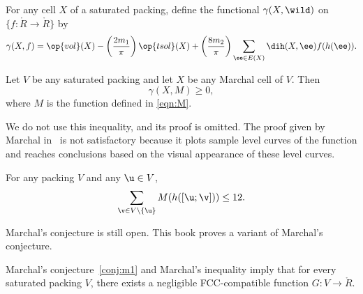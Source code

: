 \begin{definition}[$\gamma$] 
   For any cell $X$ of a saturated
  packing, define the functional $\gamma(X,\wild)$ on
  $\{f:\ring{R}\to\ring{R}\}$ by
\begin{equation}\label{eqn:gamma-def} 
\gamma(X,f) =  \op{vol}(X)
-\left(\frac{2m_1}{\pi}\right) \op{tsol}(X) + \left(\frac{8m_2}{\pi}\right)
\sum_{\ee\in E(X)} \dih(X,\ee)  f(h(\ee)).
\end{equation}
%
\end{definition}


\begin{theorem}\label{lemma:MI} 
  Let $V$ be any saturated packing and let $X$ be any Marchal cell of
  $V$.  Then
\begin{equation}\label{eqn:mfe} 
\gamma(X,M)\ge 0,
\end{equation}
where $M$ is the function defined in \eqref{eqn:M}.
\end{theorem}

\begin{remark}  %
  We do not use this inequality, and its proof is omitted.  The proof
  given by Marchal in~\cite{marchal:2009} is not satisfactory because
  it plots sample level curves of the function and reaches conclusions
  based on the visual appearance of these level curves.
\end{remark}


\begin{conjecture}[Marchal]\label{conj:m1} 
For any packing $ V$ and
any $ \u\in V$,
\[  
\sum_{\v\in V\setminus\{\u\}} M(h([\u;\v])) \le 12.
\] 
\end{conjecture}

Marchal's conjecture is still open.  This book proves a variant of
Marchal's conjecture.

\begin{theorem}\label{theorem:mk1} 
  Marchal's conjecture~\ref{conj:m1} and Marchal's inequality imply
  that for every saturated packing $V$, there exists a negligible
  FCC-compatible function $G:V\to \ring{R}$.
\end{theorem}

